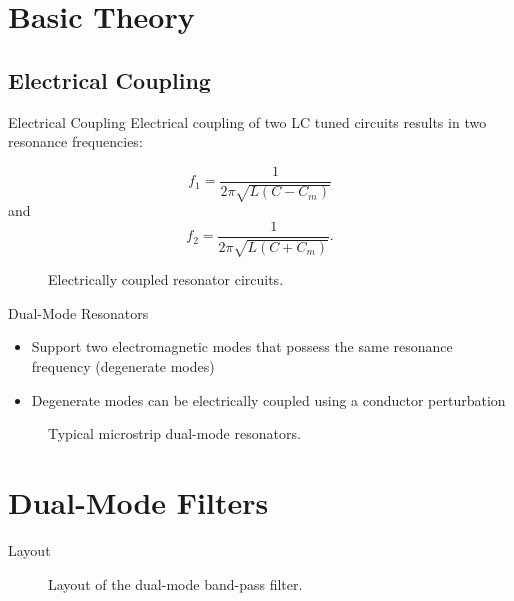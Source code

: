 \documentclass[student,english]{ihfBeamer} %
\begin{document}
\section{Basic Theory}
\contentframe

\subsection{Electrical Coupling}

\begin{frame}{Electrical Coupling}
Electrical coupling of two LC tuned circuits results in two resonance frequencies: 

\begin{equation}
f_{1} = \frac{1}{2\pi\sqrt{L(C-C_{m})}} %
\end{equation}
and 
\begin{equation}
f_{2} = \frac{1}{2\pi\sqrt{L(C+C_{m})}}. %
\end{equation}
    \begin{figure}
	\caption{Electrically coupled resonator circuits.}
\end{figure} 
\end{frame}		

\begin{frame}{Dual-Mode Resonators}
\begin{itemize}
\item 
Support two electromagnetic modes that possess the same resonance frequency (degenerate modes)
\item Degenerate modes can be electrically coupled using a conductor perturbation
\end{itemize}
\begin{figure}[h]
	\caption{Typical microstrip dual-mode resonators.}
\end{figure} 
\end{frame}

\section{Dual-Mode Filters}
\contentframe
\begin{frame}{Layout}
	\begin{figure} 
		\centering
		\caption{Layout of the dual-mode band-pass filter.}
	\end{figure}
\end{frame}
\end{document}
